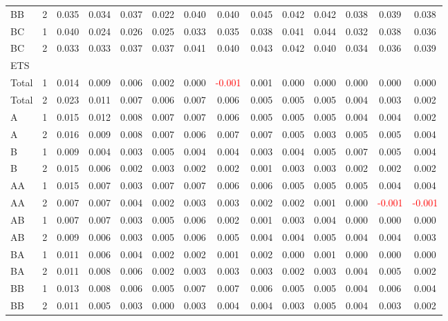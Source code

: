 \begin{table}[H]
{\begin{tabular}{llcccccccccccc}
BB & 2 & 0.035 & 0.034 & 0.037 & 0.022 & 0.040 & 0.040 & 0.045 & 0.042 & 0.042 & 0.038 & 0.039 & 0.038\\
BC & 1 & 0.040 & 0.024 & 0.026 & 0.025 & 0.033 & 0.035 & 0.038 & 0.041 & 0.044 & 0.032 & 0.038 & 0.036\\
BC & 2 & 0.033 & 0.033 & 0.037 & 0.037 & 0.041 & 0.040 & 0.043 & 0.042 & 0.040 & 0.034 & 0.036 & 0.039\\
\hline
ETS &  &  &  &  &  &  &  &  &  &  &  &  & \\
\hline
Total & 1 & 0.014 & 0.009 & 0.006 & 0.002 & 0.000 & \textcolor{red}{-0.001} & 0.001 & 0.000 & 0.000 & 0.000 & 0.000 & 0.000\\
Total & 2 & 0.023 & 0.011 & 0.007 & 0.006 & 0.007 & 0.006 & 0.005 & 0.005 & 0.005 & 0.004 & 0.003 & 0.002\\
A & 1 & 0.015 & 0.012 & 0.008 & 0.007 & 0.007 & 0.006 & 0.005 & 0.005 & 0.005 & 0.004 & 0.004 & 0.002\\
A & 2 & 0.016 & 0.009 & 0.008 & 0.007 & 0.006 & 0.007 & 0.007 & 0.005 & 0.003 & 0.005 & 0.005 & 0.004\\
B & 1 & 0.009 & 0.004 & 0.003 & 0.005 & 0.004 & 0.004 & 0.003 & 0.004 & 0.005 & 0.007 & 0.005 & 0.004\\
B & 2 & 0.015 & 0.006 & 0.002 & 0.003 & 0.002 & 0.002 & 0.001 & 0.003 & 0.003 & 0.002 & 0.002 & 0.002\\
AA & 1 & 0.015 & 0.007 & 0.003 & 0.007 & 0.007 & 0.006 & 0.006 & 0.005 & 0.005 & 0.005 & 0.004 & 0.004\\
AA & 2 & 0.007 & 0.007 & 0.004 & 0.002 & 0.003 & 0.003 & 0.002 & 0.002 & 0.001 & 0.000 & \textcolor{red}{-0.001} & \textcolor{red}{-0.001}\\
AB & 1 & 0.007 & 0.007 & 0.003 & 0.005 & 0.006 & 0.002 & 0.001 & 0.003 & 0.004 & 0.000 & 0.000 & 0.000\\
AB & 2 & 0.009 & 0.006 & 0.003 & 0.005 & 0.006 & 0.005 & 0.004 & 0.004 & 0.005 & 0.004 & 0.004 & 0.003\\
BA & 1 & 0.011 & 0.006 & 0.004 & 0.002 & 0.002 & 0.001 & 0.002 & 0.000 & 0.001 & 0.000 & 0.000 & 0.000\\
BA & 2 & 0.011 & 0.008 & 0.006 & 0.002 & 0.003 & 0.003 & 0.003 & 0.002 & 0.003 & 0.004 & 0.005 & 0.002\\
BB & 1 & 0.013 & 0.008 & 0.006 & 0.005 & 0.007 & 0.007 & 0.006 & 0.005 & 0.005 & 0.004 & 0.006 & 0.004\\
BB & 2 & 0.011 & 0.005 & 0.003 & 0.000 & 0.003 & 0.004 & 0.004 & 0.003 & 0.005 & 0.004 & 0.003 & 0.002\\

\end{tabular}}
\end{table}

